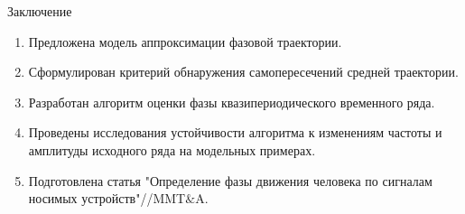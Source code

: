 \documentclass{beamer}
\begin{document}
\begin{frame}{Заключение}
    \begin{enumerate}
        \item Предложена модель аппроксимации фазовой траектории.
        
        
        \item Сформулирован критерий обнаружения самопересечений средней траектории.
    
        \item Разработан алгоритм оценки фазы квазипериодического временного ряда.
    
    
        
        \item Проведены исследования устойчивости алгоритма к изменениям частоты и амплитуды исходного ряда на модельных примерах.
        
        \item Подготовлена статья "Определение фазы движения человека по сигналам носимых устройств"//MMT$\&$A.
        
        
        
    \end{enumerate}
\end{frame}

\end{document}
